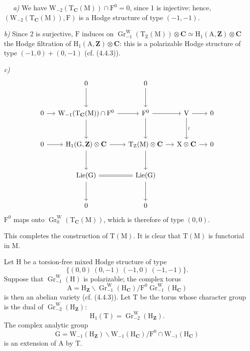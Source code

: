 \documentclass[11pt,leqno]{article}
\newcommand{\Page}[1]{\ifvmode\noindent\else\unskip\ \fi{\footnotesize\textcolor{gray}{[p.\,#1]}}\ \ignorespaces}
\begin{document}
\Page{55}
\textit{a)} We have
\(\mathrm{W}_{-2}(\mathrm{T}_{\mathbf{C}}(\mathrm{M}))
\cap\mathrm{F}^0=0\), since 1 is injective: hence,
\((\mathrm{W}_{-2}(\mathrm{T}_{\mathbf{C}}(\mathrm{M})),\mathrm{F})\)
is a Hodge structure of type \((-1,-1)\).

\textit{b)} Since 2 is surjective, \(\mathrm{F}\) induces on
\(\operatorname{Gr}^{\mathrm{W}}_{-1}
(\mathrm{T}_{\mathrm{Z}}(\mathrm{M}))\otimes\mathbf{C}
\simeq\mathrm{H}_1(\mathrm{A},\mathbf{Z})\otimes\mathbf{C}\)
the Hodge filtration of
\(\mathrm{H}_1(\mathrm{A},\mathbf{Z})\otimes\mathbf{C}\):
this is a polarizable Hodge structure of type
\((-1,0)+(0,-1)\) (cf. (4.4.3)).

\textit{c)}
\[
\begin{tikzcd}[column sep=1.2em, row sep=2.8em]
& 0 \arrow[d] & 0 \arrow[d] & &
\\
0 \arrow[r]
&
\mathrm{W}_{-1}(\mathrm{T}_{\mathbf{C}}(\mathrm{M}))\cap\mathrm{F}^0
  \arrow[r] \arrow[d]
&
\mathrm{F}^0 \arrow[r] \arrow[d]
&
\mathrm{V} \arrow[r] \arrow[d, "\wr"]
&
0
\\
0 \arrow[r]
&
\mathrm{H}_1(\mathrm{G},\mathbf{Z})\otimes\mathbf{C}
  \arrow[r] \arrow[d]
&
\mathrm{T}_{\mathrm{Z}}(\mathrm{M})\otimes\mathbf{C}
  \arrow[r] \arrow[d]
&
\mathrm{X}\otimes\mathbf{C} \arrow[r]
&
0
\\
&
\operatorname{Lie}(\mathrm{G}) \arrow[r, equal] \arrow[d]
&
\operatorname{Lie}(\mathrm{G}) \arrow[d]
& &
\\
& 0 & 0 & &
\end{tikzcd}
\]
\(\mathrm{F}^0\) maps onto
\(\operatorname{Gr}^{\mathrm{W}}_0(\mathrm{T}_{\mathbf{C}}(\mathrm{M}))\),
which is therefore of type \((0,0)\).\par
This completes the construction of \(\mathrm{T}(\mathrm{M})\).
It is clear that \(\mathrm{T}(\mathrm{M})\) is functorial in
\(\mathrm{M}\).

Let \(\mathrm{H}\) be a torsion-free mixed Hodge structure of type
\[
\{(0,0)\ (0,-1)\ (-1,0)\ (-1,-1)\}.
\]
Suppose that \(\operatorname{Gr}^{\mathrm{W}}_{-1}(\mathrm{H})\)
is polarizable; the complex torus
\[
\mathrm{A}
=\mathrm{H}_{\mathbf{Z}}\backslash
\operatorname{Gr}^{\mathrm{W}}_{-1}(\mathrm{H}_{\mathbf{C}})
/
\mathrm{F}^0\operatorname{Gr}^{\mathrm{W}}_{-1}
(\mathrm{H}_{\mathbf{C}})
\]
is then an abelian variety (cf. (4.4.3)). Let \(\mathrm{T}\) be the
torus whose character group is the dual of
\(\operatorname{Gr}^{\mathrm{W}}_{-2}(\mathrm{H}_{\mathbf{Z}})\):
\[
\mathrm{H}_1(\mathrm{T})
=\operatorname{Gr}^{\mathrm{W}}_{-2}(\mathrm{H}_{\mathbf{Z}}).
\]
The complex analytic group
\[
\mathrm{G}
=\mathrm{W}_{-1}(\mathrm{H}_{\mathbf{Z}})\backslash
\mathrm{W}_{-1}(\mathrm{H}_{\mathbf{C}})
/
\mathrm{F}^0\cap\mathrm{W}_{-1}(\mathrm{H}_{\mathbf{C}})
\]
is an extension of \(\mathrm{A}\) by \(\mathrm{T}\).
\end{document}
